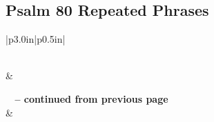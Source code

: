 \subsection{Psalm 80 Repeated Phrases}


\normalsize
 
\begin{center}
\begin{longtable}{|p{3.0in}|p{0.5in}|}
\caption[Psalm 80 Repeated Phrases]{Psalm 80 Repeated Phrases}\label{table:Repeated Phrases Psalm 80} \\
\hline {} &  \\ \hline 
\endfirsthead
 
{{\bfseries \tablename\ \thetable{} -- continued from previous page}} \\  
\hline {} &  \\ \hline 
\endhead
 

\end{longtable}
\end{center}
